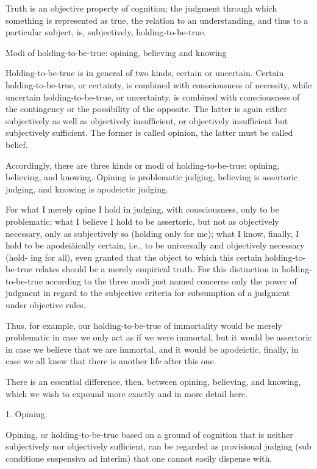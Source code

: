 Truth is an objective property of cognition;
the judgment through which something is represented as true,
the relation to an understanding, and thus to a particular subject, is,
subjectively, holding-to-be-true.

Modi of holding-to-be-true: opining, believing and knowing

Holding-to-be-true is in general of two kinds, certain or uncertain.
Certain holding-to-be-true, or certainty, is
combined with consciousness of necessity,
while uncertain holding-to-be-true, or uncertainty, is
combined with consciousness of the contingency or the possibility of the opposite.
The latter is again either subjectively as well as objectively insufficient, or
objectively insufficient but subjectively sufficient.
The former is called opinion, the latter must be called belief.

Accordingly, there are three kinds or modi of holding-to-be-true:
opining, believing, and knowing.
Opining is problematic judging,
believing is assertoric judging,
and knowing is apodeictic judging.

    For what I merely opine I hold in judging, with consciousness, only to be problematic;
    what I believe I hold to be assertoric, but not as objectively necessary, only as
    subjectively so (holding only for me); what I know, finally, I hold to be
    apodeiäically certain, i.e., to be universally and objectively necessary (hold-
    ing for all), even granted that the object to which this certain holding-to-
    be-true relates should be a merely empirical truth. For this distinction in
    holding-to-be-true according to the three modi just named concerns only
    the power of judgment in regard to the subjective criteria for subsumption of
    a judgment under objective rules.

    Thus, for example, our holding-to-be-true of immortality would be
    merely problematic in case we only act as if we were immortal,
    but it would be assertoric in case we believe that we are immortal,
    and it would be apodeictic, finally, in case we all knew that
    there is another life after this one.

    There is an essential difference, then, between opining, believing, and knowing,
    which we wish to expound more exactly and in more detail here.

    1. Opining.

    Opining, or holding-to-be-true based on a ground of cognition
    that is neither subjectively nor objectively sufficient, can be regarded
    as provisional judging (sub conditione suspensiva ad interim) that
    one cannot easily dispense with.

